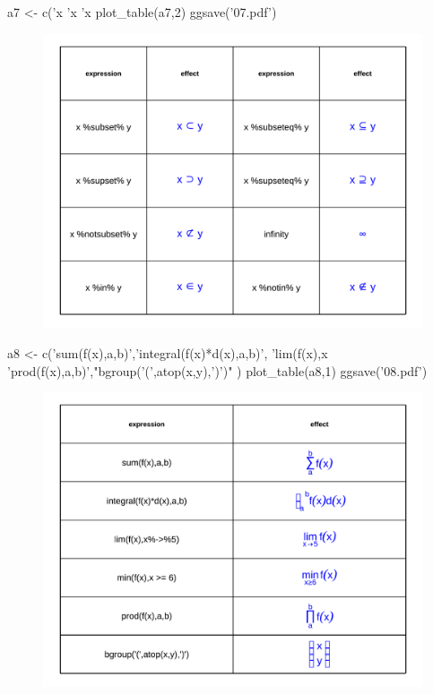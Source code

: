 \documentclass[10 pt,landscape]{article}
\begin{document}
\begin{multicols*}{3}
      \begin{R}
a7 <- c('x %
        'x %
        'x %
plot_table(a7,2)
ggsave('07.pdf')
      \end{R}
      
      \begin{figure}[H]
      \centering
        \includegraphics[width = 1\linewidth]{07.pdf}
      \end{figure}
      
      \begin{R}
a8 <- c('sum(f(x),a,b)','integral(f(x)*d(x),a,b)',
        'lim(f(x),x%
        'prod(f(x),a,b)',"bgroup('(',atop(x,y),')')"
)
plot_table(a8,1)
ggsave('08.pdf')
      \end{R}
      
      \begin{figure}[H]
      \centering
        \includegraphics[width = 1\linewidth]{08.pdf}
      \end{figure}
      

\end{multicols*}
\end{document}
